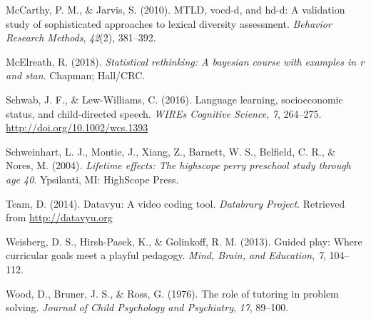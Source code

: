 \documentclass[man,floatsintext]{apa6}
\begin{document}
\leavevmode\hypertarget{ref-McCarthy2010}{}%
McCarthy, P. M., \& Jarvis, S. (2010). MTLD, vocd-d, and hd-d: A validation study of sophisticated approaches to lexical diversity assessment. \emph{Behavior Research Methods}, \emph{42}(2), 381--392.

\leavevmode\hypertarget{ref-McElreath2018}{}%
McElreath, R. (2018). \emph{Statistical rethinking: A bayesian course with examples in r and stan}. Chapman; Hall/CRC.

\leavevmode\hypertarget{ref-Schwab2016}{}%
Schwab, J. F., \& Lew-Williams, C. (2016). Language learning, socioeconomic status, and child-directed speech. \emph{WIREs Cognitive Science}, \emph{7}, 264--275. \url{http://doi.org/10.1002/wcs.1393}

\leavevmode\hypertarget{ref-PerryPreschool2004}{}%
Schweinhart, L. J., Montie, J., Xiang, Z., Barnett, W. S., Belfield, C. R., \& Nores, M. (2004). \emph{Lifetime effects: The highscope perry preschool study through age 40}. Ypsilanti, MI: HighScope Press.

\leavevmode\hypertarget{ref-datavyu}{}%
Team, D. (2014). Datavyu: A video coding tool. \emph{Databrary Project}. Retrieved from \url{http://datavyu.org}

\leavevmode\hypertarget{ref-Weisberg2013}{}%
Weisberg, D. S., Hirsh-Pasek, K., \& Golinkoff, R. M. (2013). Guided play: Where curricular goals meet a playful pedagogy. \emph{Mind, Brain, and Education}, \emph{7}, 104--112.

\leavevmode\hypertarget{ref-Wood1976}{}%
Wood, D., Bruner, J. S., \& Ross, G. (1976). The role of tutoring in problem solving. \emph{Journal of Child Psychology and Psychiatry}, \emph{17}, 89--100.

\endgroup

\clearpage
\makeatletter
\efloat@restorefloats
\makeatother
\end{document}
